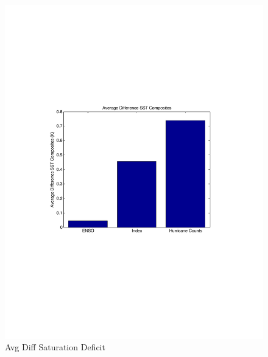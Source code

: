 \documentclass[a4paper,10pt]{article}
\begin{document}
\begin{figure}[ht]
\begin{minipage}[b]{0.6\linewidth}
\includegraphics[width=\textwidth]{figs/sensitivityResults/compositeBarGraphs/sstBarGraph.pdf}
\caption{Avg Diff Saturation Deficit}
\label{fig:figure32}
\end{minipage}
\end{figure}

\end{document}
